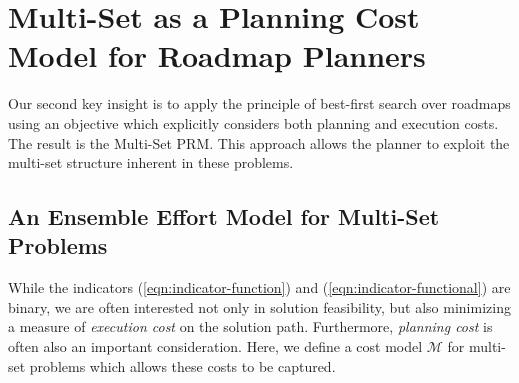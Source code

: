 %
%
%
%
%
%
%
%
%
%
%
%




\section{Multi-Set as a Planning Cost Model for Roadmap Planners}
\label{chap:multi-set-prm}

Our second key insight
is to apply the principle of best-first search over roadmaps
using an objective which explicitly considers both planning and
execution costs.
The result is the Multi-Set PRM.
This approach allows the planner to exploit the multi-set structure
inherent in these problems.

\subsection{An Ensemble Effort Model for Multi-Set Problems}
\label{subsec:cost-model}

While the indicators
(\ref{eqn:indicator-function}) and (\ref{eqn:indicator-functional})
are binary,
we are often interested not only in solution feasibility,
but also minimizing a measure of \emph{execution cost}
on the solution path.
Furthermore,
\emph{planning cost} is often also an important consideration.
Here,
we define a cost model $\mathcal{M}$
for multi-set problems
which allows these costs to be captured.

